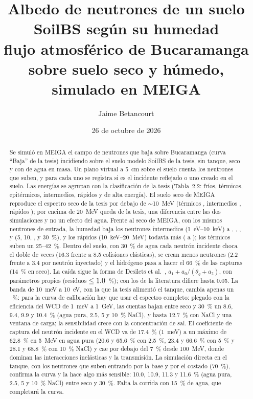 \documentclass[11pt,a4paper]{article}
\title{Albedo de neutrones de un suelo SoilBS según su humedad\\
\large flujo atmosférico de Bucaramanga sobre suelo seco y húmedo, simulado en MEIGA}
\author{Jaime Betancourt}
\date{26 de octubre de 2026}
\begin{document}
\maketitle

\begin{abstract}
Se simuló en MEIGA el campo de neutrones que baja sobre Bucaramanga (curva ``Baja'' de la tesis) incidiendo sobre el
suelo modelo SoilBS de la tesis, sin tanque, seco y con \humedades{} de agua en masa. Un plano virtual a 5~cm sobre
el suelo cuenta los neutrones que suben, y para cada uno se registra si es el incidente reflejado o uno creado en el
suelo. Las energías se agrupan con la clasificación de la tesis (Tabla~2.2: fríos, térmicos, epitérmicos,
intermedios, rápidos y de alta energía). El suelo seco de MEIGA reproduce el espectro seco de la tesis por debajo de
$\sim$10~MeV (térmicos \secoTesisTer, intermedios \secoTesisInt, rápidos \secoTesisRap); por encima de 20~MeV queda
\secoTesisAlt{} de la tesis, una diferencia entre las dos simulaciones y no un efecto del agua.
Frente al seco de MEIGA, con los mismos neutrones de entrada, la humedad baja los neutrones intermedios
(1~eV--10~keV) a \IntCinco, \IntDiez, \ifquince\IntQuince, \fi\IntVeinticinco{} y \IntTreinta{} (5, 10, ,
 y 30~\%), y los rápidos (10~keV--20~MeV) todavía más (\RapCinco{} a \RapTreinta); los térmicos suben un
25--42~\%. Dentro del suelo, con 30~\% de
agua cada neutrón incidente choca el doble de veces (16.3 frente a 8.5 colisiones elásticas), se crean menos neutrones
(2.2 frente a 3.4 por neutrón inyectado) y el hidrógeno pasa a hacer el 66~\% de las capturas (14~\% en seco). La caída sigue la forma de Desilets et al.~\cite{Desilets2010},
$a_1 + a_0/(\theta_g + a_2)$, con parámetros propios (residuos $\leq1.0$~\%); con los de la literatura
difiere hasta 0.05. La banda de 10~meV a 10~eV, con la que la tesis alimentó el tanque, cambia apenas un \bandaMax~\%: para
la curva de calibración hay que usar el espectro completo: plegado con la eficiencia del WCD de 1~meV a 1~GeV, las
cuentas bajan entre seco y 30~\% un 8.6, 9.4, 9.9 y 10.4~\% (agua pura, 2.5, 5 y 10~\% NaCl), y hasta 12.7~\% con NaCl y una
ventana de carga; la sensibilidad crece con la concentración de sal. El coeficiente de captura del neutrón incidente
en el WCD va de 17.4~\% (1~meV) a un máximo de 62.8~\% en 5~MeV en agua pura (20.6 y 65.6~\% con 2.5~\%, 23.4 y 66.6~\%
con 5~\% y 28.1 y 68.8~\% con 10~\% NaCl) y cae por
debajo del 7~\% desde 100~MeV, donde dominan las interacciones inelásticas y la transmisión. La simulación directa en el tanque, con los
neutrones que suben entrando por la base y por el costado (70~\%), confirma la curva y la hace algo más sensible: 10.0, 10.9, 11.3 y 11.6~\%
(agua pura, 2.5, 5 y 10~\% NaCl) entre seco y 30~\%.
\ifquince\else Falta la corrida con 15~\% de agua, que completará la curva.\fi
\end{abstract}
\tableofcontents
\end{document}
